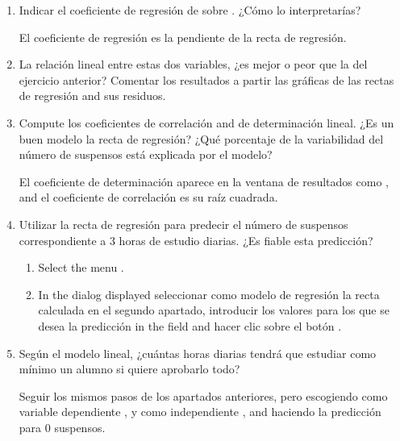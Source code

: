 \begin{enumerate}[leftmargin=*]
\begin{enumerate}
\item Indicar el coeficiente de regresión de  sobre . 
¿Cómo lo interpretarías?
\begin{indication}
El coeficiente de regresión es la pendiente de la recta de regresión.
\end{indication}

\item La relación lineal entre estas dos variables, ¿es mejor o peor que la del ejercicio anterior? 
Comentar los resultados a partir las gráficas de las rectas de regresión and sus residuos.

\item Compute los coeficientes de correlación and de determinación lineal. 
¿Es un buen modelo la recta de regresión?
¿Qué porcentaje de la variabilidad del número de suspensos está explicada por el modelo?
\begin{indication}
El coeficiente de determinación aparece en la ventana de resultados como , and el
coeficiente de correlación es su raíz cuadrada.
\end{indication}

\item Utilizar la recta de regresión para predecir el número de suspensos correspondiente a 3 horas de estudio diarias.
¿Es fiable esta predicción? 
\begin{indication}
\begin{enumerate}
\item Select the menu .
\item In the dialog displayed seleccionar como modelo de regresión la recta calculada en el segundo
apartado, introducir los valores para los que se desea la predicción in the field  and hacer clic
sobre el botón .
\end{enumerate}
\end{indication}

\item Según el modelo lineal, ¿cuántas horas diarias tendrá que estudiar como mínimo un alumno si quiere aprobarlo
todo?
\begin{indication}
Seguir los mismos pasos de los apartados anteriores, pero escogiendo como variable dependiente ,
y como independiente , and haciendo la predicción para 0 suspensos.
\end{indication}
\end{enumerate}



\end{enumerate}
